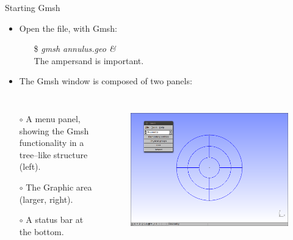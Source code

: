 \documentclass[t]{beamer}
\begin{document}
\begin{frame}{Starting Gmsh}
  \begin{itemize} 
     \item Open the file, with Gmsh:
     \begin{itemize} 
         \item[\$] \emph{gmsh annulus.geo \&} \\ \hspace{10pt} The ampersand is important.
     \end{itemize} 
     \item The Gmsh window is composed of two panels:
  \end{itemize}
\begin{columns}[l]
\column{2.3in}
  \begin{itemize} 
        \item[$\circ$] A menu panel, showing the Gmsh functionality in a tree--like structure (left).
        \item[$\circ$] The Graphic area (larger, right).
        \item[$\circ$] A status bar at the bottom.
  \end{itemize}
\column{2.2in}
\begin{figure}[htbp!]
 \centering
  \includegraphics[width=1.0\textwidth]{../figures/annulus1}
  \label{fig:annulus1}
\end{figure}
\end{columns}
\end{frame}
\end{document}

